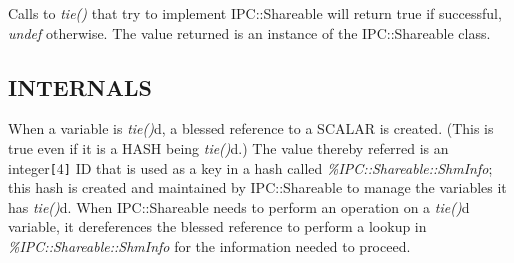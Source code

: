 Calls to {\em tie()\/} that try to implement IPC::Shareable will return true
if successful, {\em undef\/} otherwise.  The value returned is an instance
of the IPC::Shareable class.

\subsection*{INTERNALS}%

When a variable is {\em tie()\/}d, a blessed reference to a SCALAR is created.
(This is true even if it is a HASH being {\em tie()\/}d.)  The value thereby
referred is an integer{\tt [}4{\tt ]} ID that is used as a key in a hash called
{\em \%IPC::Shareable::Shm\underscore{}Info\/}; this hash is created and maintained by
IPC::Shareable to manage the variables it has {\em tie()\/}d.  When
IPC::Shareable needs to perform an operation on a {\em tie()\/}d variable, it
dereferences the blessed reference to perform a lookup in
{\em \%IPC::Shareable::Shm\underscore{}Info\/} for the information needed to proceed.

